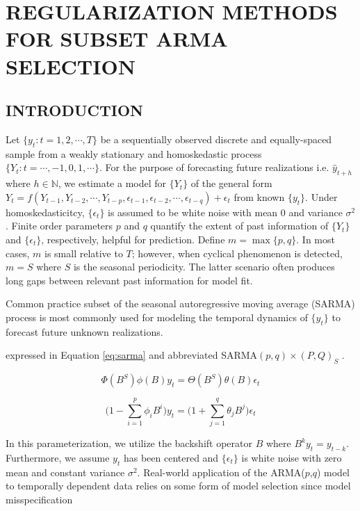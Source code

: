 \chapter{REGULARIZATION METHODS FOR SUBSET ARMA SELECTION}

\section{INTRODUCTION}

Let $\{y_t: t=1,2,\cdots,T\}$ be a sequentially observed discrete and equally-spaced sample from a weakly stationary and homoskedastic process $\{Y_t:t=\cdots,-1,0,1,\cdots\}$. For the purpose of forecasting future realizations i.e. $\hat{y}_{t+h}$ where $h\in\mathbb{N}$, we estimate a model for $\{Y_t\}$ of the general form $Y_{t}=f(Y_{t-1},Y_{t-2},\cdots,Y_{t-p},\epsilon_{t-1},\epsilon_{t-2},\cdots,\epsilon_{t-q})+\epsilon_t$ from known $\{y_t\}$. Under homoskedasticitcy, $\{\epsilon_t\}$ is assumed to be white noise with mean 0 and variance $\sigma^2$.  Finite order parameters $p$ and $q$  quantify the extent of past information of $\{Y_t\}$ and $\{\epsilon_t\}$, respectively, helpful for prediction. Define $m=\max\{p,q\}$. In most cases, $m$ is small relative to $T$; however, when cyclical phenomenon is detected, $m=S$ where $S$ is the seasonal periodicity. The latter scenario often produces long gaps between relevant past information for model fit.

Common practice subset of the seasonal autoregressive moving average (SARMA) process is most commonly used for modeling the temporal dynamics of $\{y_t\}$ to forecast future unknown realizations. 

expressed in Equation \ref{eq:sarma} and abbreviated SARMA$(p,q)\times(P,Q)_{S}$ .


\begin{equation}
\label{eq:sarma}
\Phi(B^S)\phi(B)y_t=\Theta(B^S)\theta(B)\epsilon_t
\end{equation}

\begin{equation}
\label{eq:arma}
\bigg(1-\sum\limits_{i=1}^{p}\phi_{i}B^i\bigg)y_{t}=\bigg(1+\sum\limits_{j=1}^{q}\theta_{j}B^j\bigg)\epsilon_{t}
\end{equation}

In this parameterization, we utilize the backshift operator $B$ where $B^ky_{t}=y_{t-k}$. Furthermore, we assume $y_t$ has been centered and $\{\epsilon_t\}$ is white noise with zero mean and constant variance $\sigma^2$. Real-world application of the ARMA($p$,$q$) model to temporally dependent data relies on some form of model selection since model misspecification  

